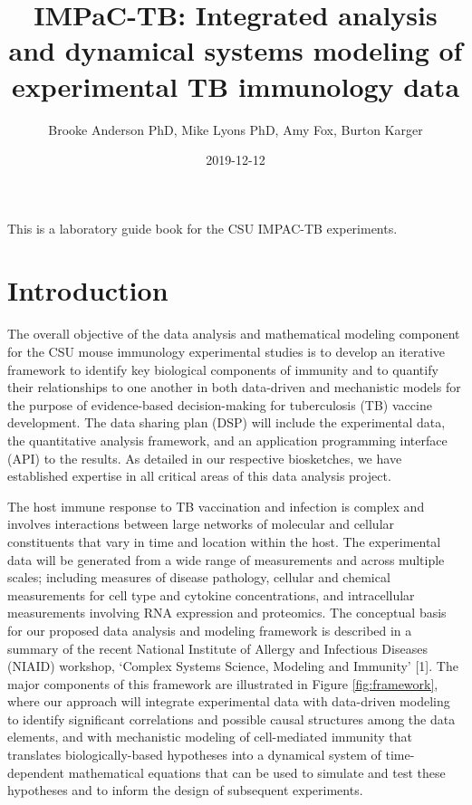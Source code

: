 \documentclass[]{book}
\title{IMPaC-TB: Integrated analysis and dynamical systems modeling of
experimental TB immunology data}
\author{Brooke Anderson PhD, Mike Lyons PhD, Amy Fox, Burton Karger}
\date{2019-12-12}
\begin{document}
\maketitle

{
\setcounter{tocdepth}{1}
\tableofcontents
}
This is a laboratory guide book for the CSU IMPAC-TB experiments.

\chapter{Introduction}\label{intro}

The overall objective of the data analysis and mathematical modeling
component for the CSU mouse immunology experimental studies is to
develop an iterative framework to identify key biological components of
immunity and to quantify their relationships to one another in both
data-driven and mechanistic models for the purpose of evidence-based
decision-making for tuberculosis (TB) vaccine development. The data
sharing plan (DSP) will include the experimental data, the quantitative
analysis framework, and an application programming interface (API) to
the results. As detailed in our respective biosketches, we have
established expertise in all critical areas of this data analysis
project.

The host immune response to TB vaccination and infection is complex and
involves interactions between large networks of molecular and cellular
constituents that vary in time and location within the host. The
experimental data will be generated from a wide range of measurements
and across multiple scales; including measures of disease pathology,
cellular and chemical measurements for cell type and cytokine
concentrations, and intracellular measurements involving RNA expression
and proteomics. The conceptual basis for our proposed data analysis and
modeling framework is described in a summary of the recent National
Institute of Allergy and Infectious Diseases (NIAID) workshop, `Complex
Systems Science, Modeling and Immunity' {[}1{]}. The major components of
this framework are illustrated in Figure \ref{fig:framework}, where our
approach will integrate experimental data with data-driven modeling to
identify significant correlations and possible causal structures among
the data elements, and with mechanistic modeling of cell-mediated
immunity that translates biologically-based hypotheses into a dynamical
system of time-dependent mathematical equations that can be used to
simulate and test these hypotheses and to inform the design of
subsequent experiments.
\end{document}
